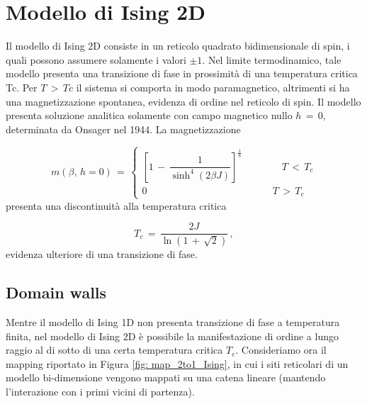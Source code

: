 \section{Modello di Ising 2D}

Il modello di Ising 2D consiste in un reticolo quadrato bidimensionale di spin, i quali possono assumere solamente i valori 
$\pm 1$. Nel limite termodinamico, tale modello presenta una transizione di fase in prossimità di una temperatura critica Tc.
Per $T\,>\,Tc$ il sistema si comporta in modo paramagnetico, altrimenti si ha una magnetizzazione spontanea, evidenza 
di ordine nel reticolo di spin. Il modello presenta soluzione analitica solamente con campo magnetico nullo $h\,=\,0$, 
determinata da Onsager nel 1944. La magnetizzazione 

\begin{equation}
    m\left(\beta,\,h=0\right)\,=\,
    \begin{cases}
    \left[1\,-\,\dfrac{1}{\sinh^4{\left(2\beta J\right)}}\right]^{\frac{1}{8}} \qquad \qquad T\,<\,T_c \\
    0 \qquad \qquad \qquad \qquad \qquad \qquad \,\,\,\, T\,>\,T_c
    \end{cases}
    \label{eq: magn_Onsager_1944}
\end{equation}
presenta una discontinuità alla temperatura critica 

\begin{equation}
    T_c\,=\,\frac{2J}{\ln{\left(1\,+\,\sqrt{2}\right)}}\,,
    \label{eq: tc_Ising2D_Ons}
\end{equation}
evidenza ulteriore di una transizione di fase.


\subsection{Domain walls}

Mentre il modello di Ising 1D non presenta transizione di fase a temperatura finita, nel modello di Ising 2D è possibile la manifestazione 
di ordine a lungo raggio al di sotto di una certa temperatura critica $T_c$. Consideriamo ora il mapping riportato in Figura 
\ref{fig: map_2to1_Ising}, in cui i siti reticolari di un modello bi-dimensione vengono mappati su una catena lineare (mantendo 
l'interazione con i primi vicini di partenza).

